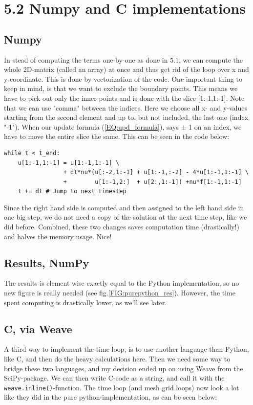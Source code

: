 \documentclass[a4paper]{article}
\begin{document}
\section*{5.2 Numpy and C implementations}
\subsection*{Numpy}
In stead of computing the terms one-by-one as done in 5.1, we can compute the whole 2D-matrix (called an array) at once and thus get rid of the loop over x and y-coordinate. This is done by vectorization of the code. One important thing to keep in mind, is that we want to exclude the boundary points. This means we have to pick out only the inner points and is done with the slice [1:-1,1:-1]. Note that we can use "comma" between the indices. Here we choose all x- and y-values starting from the second element and up to, but not included, the last one (index "-1"). When our update formula (\ref{EQ:upd_formula}), says $\pm$ 1 on an index, we have to move the entire slice the same. This can be seen in the code below:
\newline

\begin{verbatim}
while t < t_end:
    u[1:-1,1:-1] = u[1:-1,1:-1] \
                 + dt*nu*(u[:-2,1:-1] + u[1:-1,:-2] - 4*u[1:-1,1:-1] \
                 +        u[1:-1,2:]  + u[2:,1:-1]) +nu*f[1:-1,1:-1]
    t += dt # Jump to next timestep
\end{verbatim}

Since the right hand side is computed and then assigned to the left hand side in one big step, we do not need a copy of the solution at the next time step, like we did before. Combined, these two changes saves computation time (drastically!) and halves the memory usage. Nice!

\subsection*{Results, NumPy}
The results is element wise exactly equal to the Python implementation, so no new figure is really needed (see fig.\ref{FIG:purepython_res}). However, the time spent computing is drastically lower, as we'll see later.

\subsection*{C, via Weave}
A third way to implement the time loop, is to use another language than Python, like C, and then do the heavy calculations here. Then we need some way to bridge these two languages, and my decision ended up on using Weave from the SciPy-package. We can then write C-code as a string, and call it with the \texttt{weave.inline()}-function. The time loop (and mesh grid loops) now look a lot like they did in the pure python-implementation, as can be seen below:
\newline
\end{document}
